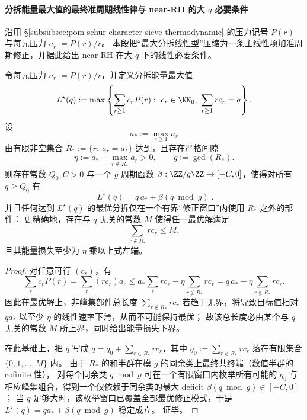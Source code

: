 
\paragraph{分拆能量最大值的最终准周期线性律与 near-RH 的大 \texorpdfstring{$q$}{q} 必要条件}
沿用 \S\ref{subsubsec:pom-schur-character-sieve-thermodynamic} 的压力记号 \(P(r)\) 与每元压力 \(a_r:=P(r)/r\)。
本段把“最大分拆线性型”压缩为一条主线性项加准周期修正，并据此给出 near-RH 在大 \(q\) 下的线性必要条件。

\begin{proposition}\label{prop:pom-schur-partition-energy-eventual-quasiperiodic-linear-law}
令每元压力 \(a_r:=P(r)/r\)，并定义分拆能量最大值
\[
L^\star(q):=\max\left\{\sum_{r\ge 1}c_r P(r):\ c_r\in\NN_0,\ \sum_{r\ge 1}r c_r=q\right\}.
\]
设
\[
a_*:=\max_{r\ge 1}a_r
\]
由有限非空集合
\(
R_*:=\{r:\ a_r=a_*\}
\)
达到，且存在严格间隙
\[
\eta:=a_*-\max_{r\notin R_*}a_r>0,
\qquad
g:=\gcd(R_*).
\]
则存在常数 \(Q_0,C>0\) 与一个 \(g\)-周期函数 \(\beta:\ZZ/g\ZZ\to[-C,0]\)，使得对所有 \(q\ge Q_0\) 有
\[
\boxed{\;
L^\star(q)=q\,a_*+\beta(q\bmod g)\; }.
\]
并且任何达到 \(L^\star(q)\) 的最优分拆仅在一个有界“修正窗口”内使用 \(R_*\) 之外的部件：
更精确地，存在与 \(q\) 无关的常数 \(M\) 使得任一最优解满足
\[
\sum_{r\notin R_*} r c_r\le M,
\]
且其能量损失至少为 \(\eta\) 乘以上式左端。
\end{proposition}
\begin{proof}
对任意可行 \((c_r)\)，有
\[
\sum_r c_r P(r)=\sum_r (r c_r)a_r
\le a_*\sum_r r c_r-\eta\sum_{r\notin R_*}r c_r
=q\,a_*-\eta\sum_{r\notin R_*}r c_r.
\]
因此在最优解上，非峰集部件总长度 \(\sum_{r\notin R_*}r c_r\) 若趋于无界，将导致目标值相对 \(q a_*\) 以至少 \(\eta\) 的线性速率下滑，从而不可能保持最优；
故该总长度必由某个与 \(q\) 无关的常数 \(M\) 所上界，同时给出能量损失下界。
\par
在此基础上，把 \(q\) 写成
\(
q=q_0+\sum_{r\in R_*} r c_r
\)，其中 \(q_0:=\sum_{r\notin R_*} r c_r\) 落在有限集合 \(\{0,1,\dots,M\}\) 内。
由于 \(R_*\) 的和半群在模 \(g\) 的同余类上最终共终端（数值半群的 cofinite 性），
对每个同余类 \(q\bmod g\) 可在一个有限窗口内枚举所有可能的 \(q_0\) 与相应峰集组合，得到一个仅依赖于同余类的最大 deficit
\(
\beta(q\bmod g)\in[-C,0]
\)；
当 \(q\) 足够大时，该枚举窗口已覆盖全部最优修正模式，于是 \(L^\star(q)=q a_*+\beta(q\bmod g)\) 稳定成立。
证毕。
\end{proof}

